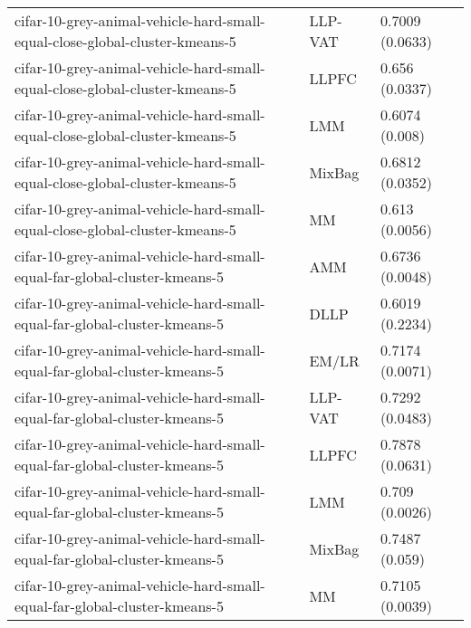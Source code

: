 \begin{longtable}{lll}
                                  cifar-10-grey-animal-vehicle-hard-small-equal-close-global-cluster-kmeans-5 &   LLP-VAT &                       0.7009 (0.0633) \\
                                  cifar-10-grey-animal-vehicle-hard-small-equal-close-global-cluster-kmeans-5 &     LLPFC &                        0.656 (0.0337) \\
                                  cifar-10-grey-animal-vehicle-hard-small-equal-close-global-cluster-kmeans-5 &       LMM &                        0.6074 (0.008) \\
                                  cifar-10-grey-animal-vehicle-hard-small-equal-close-global-cluster-kmeans-5 &    MixBag &                       0.6812 (0.0352) \\
                                  cifar-10-grey-animal-vehicle-hard-small-equal-close-global-cluster-kmeans-5 &        MM &                        0.613 (0.0056) \\
                                    cifar-10-grey-animal-vehicle-hard-small-equal-far-global-cluster-kmeans-5 &       AMM &                       0.6736 (0.0048) \\
                                    cifar-10-grey-animal-vehicle-hard-small-equal-far-global-cluster-kmeans-5 &      DLLP &                       0.6019 (0.2234) \\
                                    cifar-10-grey-animal-vehicle-hard-small-equal-far-global-cluster-kmeans-5 &     EM/LR &                       0.7174 (0.0071) \\
                                    cifar-10-grey-animal-vehicle-hard-small-equal-far-global-cluster-kmeans-5 &   LLP-VAT &                       0.7292 (0.0483) \\
                                    cifar-10-grey-animal-vehicle-hard-small-equal-far-global-cluster-kmeans-5 &     LLPFC &                       0.7878 (0.0631) \\
                                    cifar-10-grey-animal-vehicle-hard-small-equal-far-global-cluster-kmeans-5 &       LMM &                        0.709 (0.0026) \\
                                    cifar-10-grey-animal-vehicle-hard-small-equal-far-global-cluster-kmeans-5 &    MixBag &                        0.7487 (0.059) \\
                                    cifar-10-grey-animal-vehicle-hard-small-equal-far-global-cluster-kmeans-5 &        MM &                       0.7105 (0.0039) \\

\end{longtable}
